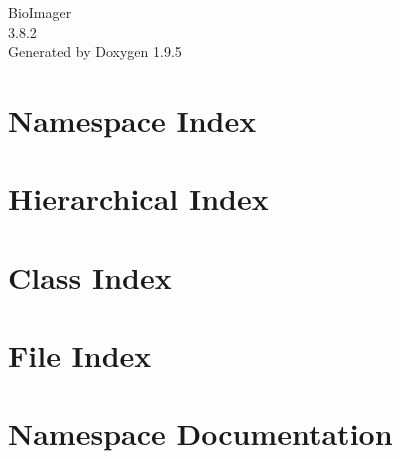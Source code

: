 \documentclass[twoside]{book}
\newcommand{\+}{\discretionary{\mbox{\scriptsize$\hookleftarrow$}}{}{}}
\newcommand{\clearemptydoublepage}{%
    \newpage{\pagestyle{empty}\cleardoublepage}%
  }
\begin{document}
  \raggedbottom
    \hypersetup{pageanchor=false,
                bookmarksnumbered=true,
                pdfencoding=unicode
               }
  \begin{titlepage}
  \vspace*{7cm}
  \begin{center}%
  {\Large Bio\+Imager}\\
  [1ex]\large 3.\+8.\+2 \\
  \vspace*{1cm}
  {\large Generated by Doxygen 1.9.5}\\
  \end{center}
  \end{titlepage}
  \clearemptydoublepage
  \tableofcontents
  \clearemptydoublepage
  \hypersetup{pageanchor=true}
\chapter{Namespace Index}

\chapter{Hierarchical Index}

\chapter{Class Index}

\chapter{File Index}

\chapter{Namespace Documentation}



\end{document}
